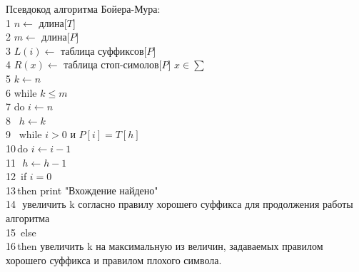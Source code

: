 \documentclass[a4paper,12pt]{article}
\begin{document}
Псевдокод алгоритма Бойера-Мура:\\
1 $n \leftarrow$ длина[$T$]\\
2 $m \leftarrow$ длина[$P$]\\
3 $L(i) \leftarrow$ таблица суффиксов[$P$]\\
4 $R(x) \leftarrow$ таблица стоп-симолов[$P$] $x \in \sum$\\
5 $k \leftarrow n$\\
6 while $k \leqslant m$\\
7 \quad do $i \leftarrow n$\\
8 \quad\,  $h \leftarrow k$\\
9 \quad\,  while $i > 0$ и $P[i] = T[h]$\\
10\quad\,\quad do $i \leftarrow i - 1$\\
11\quad\,\quad\,  $h \leftarrow h - 1$\\
12\quad\,  if $i = 0$\\
13\quad\,\quad then print "Вхождение найдено"\\
14\quad\,\quad\, увеличить k согласно правилу хорошего суффикса для продолжения работы алгоритма\\
15\quad\,  else\\
16\quad\,\quad then увеличить k на максимальную из величин, задаваемых правилом хорошего суффикса и правилом плохого символа.\\
\end{document}
